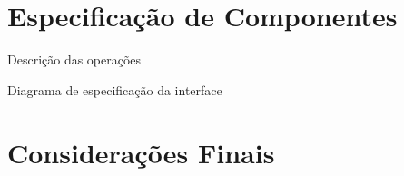 \section{Especificação de Componentes}

Descrição das operações

Diagrama de especificação da interface









\section{Considerações Finais}
